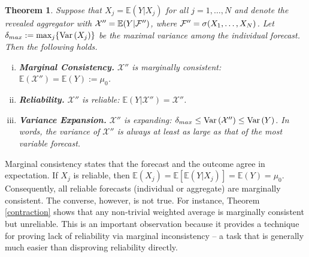 \documentclass[11pt]{article}
\newcommand{\E}{\mathbb{E}}
\newtheorem{theorem}{Theorem}[section]
\theoremstyle{definition}
\theoremstyle{definition}
\def\F{{\cal F}}
\def\E{{\mathbb E}}
\def\Var{{\rm Var}\,}
\begin{document}
\begin{theorem} \label{optimal}
Suppose that $X_j = \E(Y | X_j)$ for all $j = 1, \dots, N$ and denote the revealed aggregator with $\mathcal{X}'' = \E(Y | \F'')$, where $\F'' = \sigma(X_1, \dots, X_N)$. 
Let $\delta_{max} := \max_j \{ \Var(X_j)  \}$ be the maximal variance among the individual forecast.
 Then the following holds.
\begin{enumerate}[i)] \label{properties}
\item \textbf{Marginal Consistency.} $\mathcal{X}''$ is marginally consistent:  $\E(\mathcal{X}'') = \E(Y) :=  \mu_0$.
\item \textbf{Reliability.} $\mathcal{X}''$ is reliable: $\E(Y|\mathcal{X}'') = \mathcal{X}''$. 
\item \textbf{Variance Expansion.} $\mathcal{X}''$ is expanding: $\delta_{max} \leq \Var(\mathcal{X}'') \leq \Var(Y)$. In words, the variance of $\mathcal{X}''$ is always at least as large as that of the most variable forecast. 
\end{enumerate}
\end{theorem}
Marginal consistency states that the forecast and the outcome agree in expectation. If $X_j$ is reliable, then $\E(X_j) = \E[\E(Y|X_j)] = \E(Y) = \mu_0$. Consequently, all reliable forecasts (individual or aggregate) are marginally consistent. The converse, however, is not true. For instance, Theorem \ref{contraction} shows that any non-trivial weighted average is marginally consistent but unreliable. This is an important observation because it provides a technique for proving lack of reliability via marginal inconsistency -- a task that is generally much easier than disproving reliability directly.
\end{document}
